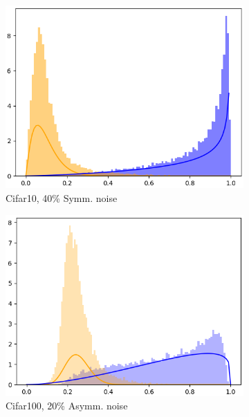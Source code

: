 \documentclass{article}
\begin{document}
\begin{figure}[htbp]
\centering
\begin{subfigure}[tb]{0.3\textwidth}
  \includegraphics[width=\linewidth]{figs/BMMcifar10symmetricnoise40.png}
  \centering
  \scriptsize{Cifar10, 40\% Symm. noise}
  \end{subfigure}
\hspace{.2cm}
  \begin{subfigure}[tb]{0.3\textwidth}
  \includegraphics[width=\linewidth]{figs/BMMcifar100asymmetricnoise20.png}
  \centering
  \scriptsize{Cifar100, 20\% Asymm. noise}

\end{subfigure}
\end{figure}
\end{document}

